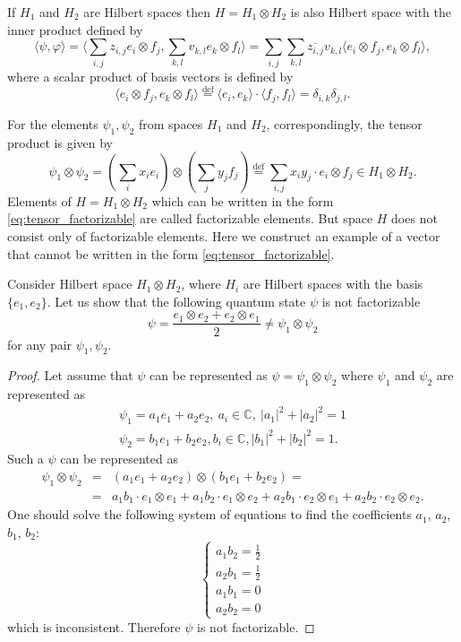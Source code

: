 \documentclass[11pt]{article}
\begin{document}
If $H_1$ and $H_2$ are Hilbert spaces then $H = H_1\otimes H_2$ is also Hilbert space with the inner product defined by
\[
\langle\psi, \varphi\rangle = \langle \sum_{i,j}z_{i,j}e_i\otimes f_j, \sum_{k,l}v_{k,l}e_k\otimes f_l \rangle = \sum_{i, j}\sum_{k, l}\overline{z_{i,j}}v_{k,l} \langle e_i\otimes f_j, e_k\otimes f_l \rangle,
\]
where a scalar product of basis vectors is defined by
\[
\langle e_i\otimes f_j, e_k\otimes f_l \rangle \overset{\mbox{def}}= \langle e_i, e_k\rangle \cdot \langle f_j, f_l \rangle = \delta_{i, k}\delta_{j, l}.
\]

For the elements $\psi_1, \psi_2$ from spaces $H_1$ and $H_2$, correspondingly, the tensor product is given by
\begin{equation}
\psi_1 \otimes \psi_2 = \left(\sum_ix_ie_i\right) \otimes \left(\sum_jy_jf_j\right) \overset{\mbox{def}}= \sum_{i, j} x_iy_j \cdot e_i \otimes f_j \in H_1 \otimes H_2.
\label{eq:tensor_factorizable}
\end{equation}
Elements of $H = H_1\otimes H_2$ which can be written in the form \eqref{eq:tensor_factorizable} are called factorizable elements. But space $H$ does not consist only of factorizable elements. Here we construct an example of a vector that cannot be written in the form  \eqref{eq:tensor_factorizable}.

Consider Hilbert space $H_1\otimes H_2$, where $H_i$ are Hilbert spaces with the basis $\{e_1, e_2\}$. Let us show that the following quantum state $\psi$ is not factorizable
\[
	\psi = \frac{e_1 \otimes e_2 + e_2 \otimes e_1}{2} \ne \psi_1 \otimes \psi_2
\]
for any pair $\psi_1, \psi_2$.
\begin{proof}
Let assume that $\psi$ can be represented as $\psi = \psi_1\otimes\psi_2$ where
$\psi_1$ and $\psi_2$ are represented as
\begin{gather*}
	\psi_1 = a_1 e_1 + a_2 e_2,\ a_i\in \mathbb{C},\ |a_1|^2 + |a_2|^2 = 1 \\
	\psi_2 = b_1 e_1 + b_2 e_2, b_i\in \mathbb{C}, |b_1|^2 + |b_2|^2 = 1.
\end{gather*}
Such a $\psi$ can be represented as
\begin{eqnarray*}
	\psi_1 \otimes \psi_2 &=& (a_1 e_1 + a_2 e_2) \otimes (b_1 e_1 + b_2 e_2) = \\ &=&  
	a_1 b_1 \cdot e_1 \otimes e_1 + a_1 b_2 \cdot e_1 \otimes e_2 + 
	a_2 b_1 \cdot e_2 \otimes e_1 + a_2 b_2 \cdot e_2 \otimes e_2.
\end{eqnarray*}
One should solve the following system of equations to find the coefficients $a_1$, $a_2$, $b_1$, $b_2$:
$$
\begin{cases}
a_1 b_2 = \frac12 \\
a_2 b_1 = \frac12 \\
a_1 b_1 = 0 \\
a_2 b_2 = 0
\end{cases}
$$
which is inconsistent. Therefore $\psi$ is not factorizable.
\end{proof}
 
\end{document}
